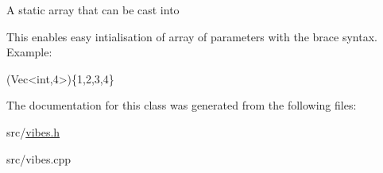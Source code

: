 A static array that can be cast into

This enables easy intialisation of array of parameters with the brace syntax. Example\+: 
\begin{DoxyCode}
(Vec<int,4>)\{1,2,3,4\}
\end{DoxyCode}
 

The documentation for this class was generated from the following files\+:\begin{DoxyCompactItemize}
\item 
src/\hyperlink{vibes_8h}{vibes.\+h}\item 
src/vibes.\+cpp\end{DoxyCompactItemize}
